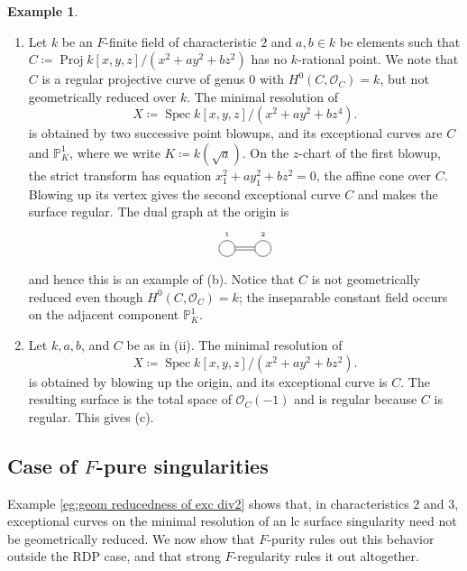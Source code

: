 \documentclass[12pt]{amsart}
\def\Spec{\operatorname{Spec}}
\def\Proj{\operatorname{Proj}}
\newcommand{\PP}{\mathbb{P}}
\newcommand{\sO}{\mathcal{O}}
\theoremstyle{plain}
\theoremstyle{definition}
\newtheorem{eg}[thm]{Example}
\theoremstyle{remark}
\newtheorem{defn and notation}[thm]{Definition and Notation}
\theoremstyle{plain}
\numberwithin{equation}{thm}
\begin{document}
\begin{eg}
\begin{enumerate}[label=\textup{(\arabic*)}]
\begin{enumerate}[label=\textup{(\roman*)}]
\[\begin{tikzpicture}
    \draw (B1.20)--(B2.160);
    \draw (B1)--(B2);
    \draw (B1.-20)--(B2.200);
    \end{tikzpicture}
    \]
and hence this is an example of (a).
\item Let $k$ be an $F$-finite field of characteristic $2$ and $a, b \in k$ be elements such that $C \coloneqq \Proj k[x,y,z]/(x^2+ay^2+bz^2)$ has no $k$-rational point.
We note that $C$ is a regular projective curve of genus $0$ with $H^0(C, \sO_C) = k$, but not geometrically reduced over $k$.
The minimal resolution of
\[
X \coloneqq \Spec k[x,y,z]/(x^2+ay^2+bz^4).
\] 
is obtained by two successive point blowups, and its exceptional curves are $C$ and $\PP^1_{K}$, where we write $K \coloneqq k(\sqrt{a})$.
On the $z$-chart of the first blowup, the strict transform has equation $x_1^2+ay_1^2+bz^2=0$, the affine cone over $C$.
Blowing up its vertex gives the second exceptional curve $C$ and makes the surface regular.
The dual graph at the origin is
\[
\begin{tikzpicture}
\node[draw, shape=circle, inner sep=4.5pt] (B1) at (0,0){};
\draw[shift={(0,0.4)}] (0,0) node{\tiny $1$};
\node[draw, shape=circle, inner sep=4.5pt] (B2) at (1,0){};
\draw[shift={(0,0.4)}] (1,0) node{\tiny $2$};

\draw (B1.10)--(B2.170);
\draw (B1.-10)--(B2.190);
\end{tikzpicture}
\]
and hence this is an example of (b). Notice that $C$ is not geometrically reduced even though $H^0(C,\sO_C)=k$; the inseparable constant field occurs on the adjacent component $\PP^1_K$.


\item Let $k,a,b$, and $C$ be as in (ii).
The minimal resolution of
\[
X \coloneqq \Spec k[x,y,z]/(x^2+ay^2+bz^2).
\] 
is obtained by blowing up the origin, and its exceptional curve is $C$.
The resulting surface is the total space of $\sO_C(-1)$ and is regular because $C$ is regular.
This gives (c).
\end{enumerate}
\end{enumerate}
\end{eg}



\subsection{Case of \texorpdfstring{$F$}{F}-pure singularities}

Example \ref{eg:geom reducedness of exc div2} shows that, in characteristics $2$ and $3$, exceptional curves on the minimal resolution of an lc surface singularity need not be geometrically reduced.
We now show that $F$-purity rules out this behavior outside the RDP case, and that strong $F$-regularity rules it out altogether.
\end{document}
